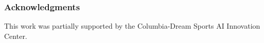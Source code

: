\documentclass{article} %
\theoremstyle{plain} %
\theoremstyle{definition} %
\theoremstyle{remark} %
\begin{document}
%


\subsubsection*{Acknowledgments}
This work was partially supported by the Columbia-Dream Sports AI Innovation Center.




\appendix


\end{document}
